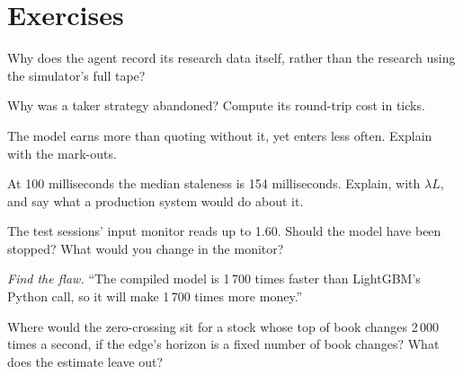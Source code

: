 \section{Exercises}

\begin{exercise}[$\star$]\label{exo:ml:build-an-order-book-model-end-to-end:1}
Why does the agent record its research data itself, rather than the research using the simulator's full tape?
\end{exercise}

\begin{exercise}[$\star$]\label{exo:ml:build-an-order-book-model-end-to-end:2}
Why was a taker strategy abandoned? Compute its round-trip cost in ticks.
\end{exercise}

\begin{exercise}[$\star$]\label{exo:ml:build-an-order-book-model-end-to-end:3}
The model earns more than quoting without it, yet enters less often. Explain with the mark-outs.
\end{exercise}

\begin{exercise}[$\star\star$]\label{exo:ml:build-an-order-book-model-end-to-end:4}
At 100 milliseconds the median staleness is 154 milliseconds. Explain, with $\lambda L$, and say what a production system would do
about it.
\end{exercise}

\begin{exercise}[$\star\star$]\label{exo:ml:build-an-order-book-model-end-to-end:5}
The test sessions' input monitor reads up to 1.60. Should the model have been stopped? What would you change in the monitor?
\end{exercise}

\begin{exercise}[$\star\star$]\label{exo:ml:build-an-order-book-model-end-to-end:6}
\emph{Find the flaw.} ``The compiled model is 1\,700 times faster than LightGBM's Python call, so it will make 1\,700 times more
money.''
\end{exercise}

\begin{exercise}[$\star\star\star$]\label{exo:ml:build-an-order-book-model-end-to-end:7}
Where would the zero-crossing sit for a stock whose top of book changes 2\,000 times a second, if the edge's horizon is a fixed
number of book changes? What does the estimate leave out?
\end{exercise}

